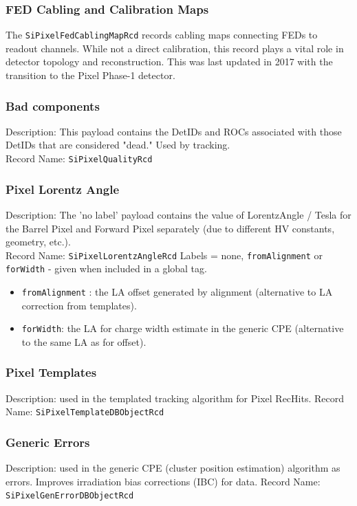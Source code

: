 \subsubsection{FED Cabling and Calibration Maps}
The \texttt{SiPixelFedCablingMapRcd} records cabling maps connecting FEDs to readout channels. While not a direct calibration, this record plays a vital role in detector topology and reconstruction. This was last updated in 2017 with the transition to the Pixel Phase-1 detector.

\subsubsection{Bad components}
Description: This payload contains the DetIDs and ROCs associated with those DetIDs that are considered "dead." Used by tracking.\\
Record Name: \texttt{SiPixelQualityRcd} 

\subsubsection{Pixel Lorentz Angle}
Description: The 'no label' payload contains the value of LorentzAngle / Tesla for the Barrel Pixel and Forward Pixel separately (due to different HV constants, geometry, etc.).\\
Record Name: \texttt{SiPixelLorentzAngleRcd} 
Labels = none, \texttt{fromAlignment} or \texttt{forWidth} - given when included in a global tag.
\begin{itemize}
\item \texttt{fromAlignment} : the LA offset generated by alignment (alternative to LA correction from templates).
\item \texttt{forWidth}: the LA for charge width estimate in the generic CPE (alternative to the same LA as for offset). 
\end{itemize}

\subsubsection{Pixel Templates}
Description: used in the templated tracking algorithm for Pixel RecHits.
Record Name:  \texttt{SiPixelTemplateDBObjectRcd} 

\subsubsection{Generic Errors}

Description: used in the generic CPE (cluster position estimation) algorithm as errors. Improves irradiation bias corrections (IBC) for data.
Record Name:  \texttt{SiPixelGenErrorDBObjectRcd}


